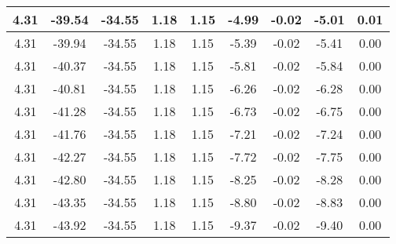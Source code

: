 \begin{table}[htbp]
\begin{adjustbox}{angle=90}
\begin{tabular}{|c|c|c|c|c|c|c|c|c|}
 4.31 & -39.54 & -34.55 & 1.18 & 1.15 & -4.99 & -0.02 & -5.01 & 0.01\\ \hline
 4.31 & -39.94 & -34.55 & 1.18 & 1.15 & -5.39 & -0.02 & -5.41 & 0.00\\ \hline
 4.31 & -40.37 & -34.55 & 1.18 & 1.15 & -5.81 & -0.02 & -5.84 & 0.00\\ \hline
 4.31 & -40.81 & -34.55 & 1.18 & 1.15 & -6.26 & -0.02 & -6.28 & 0.00\\ \hline
 4.31 & -41.28 & -34.55 & 1.18 & 1.15 & -6.73 & -0.02 & -6.75 & 0.00\\ \hline
 4.31 & -41.76 & -34.55 & 1.18 & 1.15 & -7.21 & -0.02 & -7.24 & 0.00\\ \hline
 4.31 & -42.27 & -34.55 & 1.18 & 1.15 & -7.72 & -0.02 & -7.75 & 0.00\\ \hline
 4.31 & -42.80 & -34.55 & 1.18 & 1.15 & -8.25 & -0.02 & -8.28 & 0.00\\ \hline
 4.31 & -43.35 & -34.55 & 1.18 & 1.15 & -8.80 & -0.02 & -8.83 & 0.00\\ \hline
 4.31 & -43.92 & -34.55 & 1.18 & 1.15 & -9.37 & -0.02 & -9.40 & 0.00\\ \hline
            \end{tabular}
        \end{adjustbox}
        \caption{}
        \label{}
    \end{table}
    